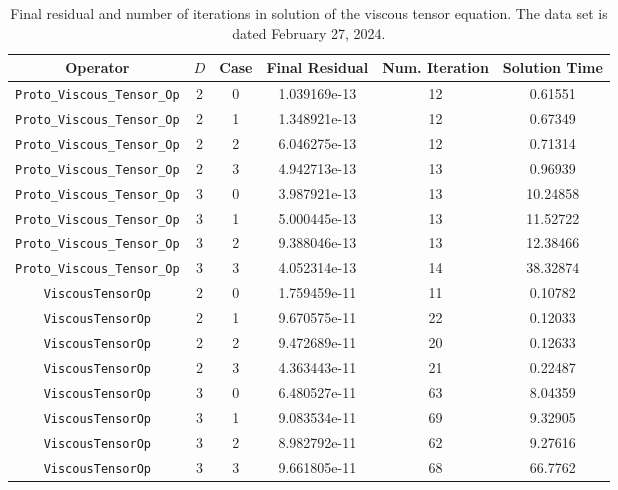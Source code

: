 \documentclass{article}
\begin{document}
\begin{itemize}
\begin{small}
\begin{table}
\begin{center}
\begin{tabular}{|c|c|c|c|c||c|} \hline
 Operator                   & $D$ & Case & Final Residual &
 Num. Iteration & Solution Time\\
\hline
 {\tt Proto\_Viscous\_Tensor\_Op} & 2   & 0    & 1.039169e-13   &  12    & 0.61551     \\
 {\tt Proto\_Viscous\_Tensor\_Op} & 2   & 1    & 1.348921e-13   &  12    & 0.67349     \\
 {\tt Proto\_Viscous\_Tensor\_Op} & 2   & 2    & 6.046275e-13   &  12    & 0.71314     \\
 {\tt Proto\_Viscous\_Tensor\_Op} & 2   & 3    & 4.942713e-13   &  13    & 0.96939     \\
 {\tt Proto\_Viscous\_Tensor\_Op} & 3   & 0    & 3.987921e-13   &  13    & 10.24858    \\
 {\tt Proto\_Viscous\_Tensor\_Op} & 3   & 1    & 5.000445e-13   &  13    & 11.52722    \\
 {\tt Proto\_Viscous\_Tensor\_Op} & 3   & 2    & 9.388046e-13   &  13    & 12.38466    \\
 {\tt Proto\_Viscous\_Tensor\_Op} & 3   & 3    & 4.052314e-13   &  14    & 38.32874    \\
\hline                                                          
 {\tt ViscousTensorOp}            & 2   & 0    & 1.759459e-11   &  11    & 0.10782     \\
 {\tt ViscousTensorOp}            & 2   & 1    & 9.670575e-11   &  22    & 0.12033     \\
 {\tt ViscousTensorOp}            & 2   & 2    & 9.472689e-11   &  20    & 0.12633     \\
 {\tt ViscousTensorOp}            & 2   & 3    & 4.363443e-11   &  21    & 0.22487     \\
 {\tt ViscousTensorOp}            & 3   & 0    & 6.480527e-11   &  63    & 8.04359     \\
 {\tt ViscousTensorOp}            & 3   & 1    & 9.083534e-11   &  69    & 9.32905     \\
 {\tt ViscousTensorOp}            & 3   & 2    & 8.982792e-11   &  62    & 9.27616     \\
 {\tt ViscousTensorOp}            & 3   & 3    & 9.661805e-11   &  68    & 66.7762     \\
\hline
\end{tabular}
\end{center}
\label{tab::viscous3}
\caption
    {
      Final residual and number of iterations in solution of the
      viscous tensor equation.
      The data set is dated February 27, 2024.
    }
\end{table}
\end{small}



\end{itemize}
\end{document}
